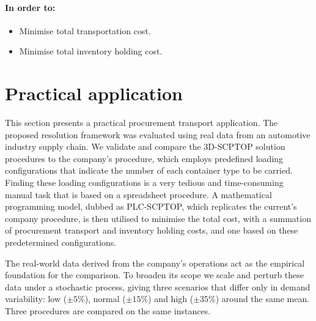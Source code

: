 {\paragraph{In order to:}
\begin{itemize}
    \item Minimise total transportation cost.
    \item Minimise total inventory holding cost.
\end{itemize}









\section{Practical application}
\label{sec:case}

This section presents a practical procurement transport application. The proposed resolution framework was evaluated using real data from an automotive industry supply chain. We validate and compare the 3D-SCPTOP solution procedures to the company’s procedure, which employs predefined loading configurations that indicate the number of each container type to be carried. Finding these loading configurations is a very tedious and time-consuming manual task that is based on a spreadsheet procedure. A mathematical programming model, dubbed as PLC-SCPTOP, which replicates the current’s company procedure, is then utilised to minimise the total cost, with a summation of procurement transport and inventory holding costs, and one based on these predetermined configurations.



{\color{blue}

The real-world data derived from the company's operations act as the
empirical foundation for the comparison. To broaden its scope we scale and
perturb these data under a stochastic process, giving three scenarios that
differ only in demand variability: low ($\pm5\%$), normal ($\pm15\%$) and
high ($\pm35\%$) around the same mean. Three procedures are compared on the
same instances.
}

}
